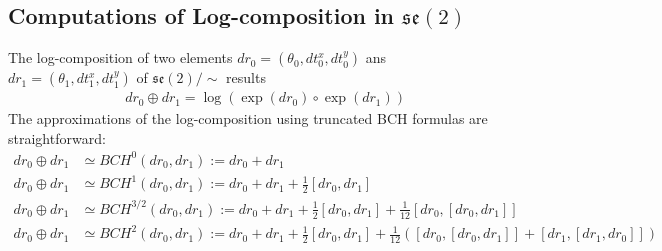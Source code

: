 \subsection{Computations of Log-composition in $\mathfrak{se}(2)$}
The log-composition of two elements $dr_0 = (\theta_0, dt^{x}_0, dt^{y}_0)$ ans $dr_1 = (\theta_1, dt^{x}_1, dt^{y}_1)$ of $ \mathfrak{se}(2)/\sim$ results
\begin{align}\label{eq:log_composition_se2_closed_form}
& dr_0 \oplus dr_1 =  \log(\exp(dr_0)\circ \exp(dr_1)) 
\end{align}
The approximations of the log-composition using truncated BCH formulas are straightforward:
\begin{align*}
dr_0 \oplus dr_1 &\simeq  BCH^{0}(dr_0,dr_1 ) := dr_0 + dr_1  \\
dr_0 \oplus dr_1 &\simeq BCH^{1}(dr_0,dr_1 ) :=  dr_0 + dr_1 + \frac{1}{2}[dr_0, dr_1] \\
dr_0 \oplus dr_1 &\simeq BCH^{3/2}(dr_{0}, dr_{1}) :=  dr_0 + dr_1 + \frac{1}{2}[dr_0, dr_1] + \frac{1}{12}[dr_0,[dr_0, dr_1]] \\
dr_0 \oplus dr_1 &\simeq BCH^{2}(dr_{0}, dr_{1}) := dr_0 + dr_1 + \frac{1}{2}[dr_0, dr_1] + \frac{1}{12}([dr_0,[dr_0, dr_1]] + [dr_1,[dr_1, dr_0]] )
\end{align*}

